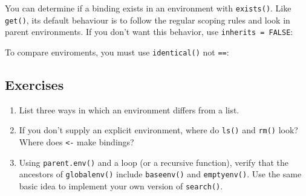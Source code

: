 You can determine if a binding exists in an environment with
\texttt{exists()}. Like \texttt{get()}, its default behaviour is to
follow the regular scoping rules and look in parent environments. If you
don't want this behavior, use \texttt{inherits = FALSE}:

\begin{Shaded}
\begin{Highlighting}[]
\StringTok{ }
\NormalTok{(}\NormalTok{, } 
\NormalTok{(}\NormalTok{, }  \NormalTok{)}
\end{Highlighting}
\end{Shaded}

To compare enviroments, you must use \texttt{identical()} not
\texttt{==}:

\begin{Shaded}
\begin{Highlighting}[]
\NormalTok{(}\NormalTok{(), }\NormalTok{())}
\NormalTok{() ==}\StringTok{ }\NormalTok{()}
\end{Highlighting}
\end{Shaded}

\subsection{Exercises}

\begin{enumerate}
\def\labelenumi{\arabic{enumi}.}
\item
  List three ways in which an environment differs from a list.
\item
  If you don't supply an explicit environment, where do \texttt{ls()}
  and \texttt{rm()} look? Where does \texttt{\textless{}-} make
  bindings?
\item
  Using \texttt{parent.env()} and a loop (or a recursive function),
  verify that the ancestors of \texttt{globalenv()} include
  \texttt{baseenv()} and \texttt{emptyenv()}. Use the same basic idea to
  implement your own version of \texttt{search()}.
\end{enumerate}

